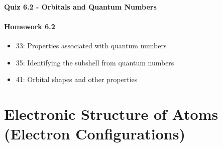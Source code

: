 \documentclass[12pt, openany, letterpaper]{memoir}
\begin{document}
\paragraph*{Quiz 6.2 - Orbitals and Quantum Numbers}
\paragraph*{Homework 6.2}
\begin{itemize}
  \item 33: Properties associated with quantum numbers
  \item 35: Identifying the subshell from quantum numbers
  \item 41: Orbital shapes and other properties
\end{itemize}

\section{Electronic Structure of Atoms (Electron Configurations)}
\end{document}
